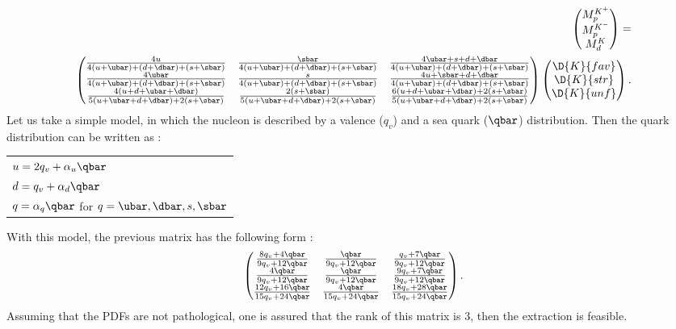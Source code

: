 \begin{equation} \label{eq:mult_sys}
  \begin{split}
  \begin{pmatrix}
    M^{K^+}_p \\
    M^{K^-}_p \\
    M^{K}_d
  \end{pmatrix}
  = \\
  \begin{pmatrix}
    \frac{4u}{4(u+\ubar)+(d+\dbar)+(s+\sbar)} & \frac{\sbar}{4(u+\ubar)+(d+\dbar)+(s+\sbar)} & \frac{4\ubar+s+d+\dbar}{4(u+\ubar)+(d+\dbar)+(s+\sbar)} \\
    \frac{4\ubar}{4(u+\ubar)+(d+\dbar)+(s+\sbar)} & \frac{s}{4(u+\ubar)+(d+\dbar)+(s+\sbar)} & \frac{4u+\sbar+d+\dbar}{4(u+\ubar)+(d+\dbar)+(s+\sbar)} \\
    \frac{4(u+d+\ubar+\dbar)}{5(u+\ubar+d+\dbar)+2(s+\sbar)} & \frac{2(s+\sbar)}{5(u+\ubar+d+\dbar)+2(s+\sbar)} & \frac{6(u+d+\ubar+\dbar)+2(s+\sbar)}{5(u+\ubar+d+\dbar)+2(s+\sbar)}
  \end{pmatrix}
  \begin{pmatrix}
    \D{K}{fav} \\
    \D{K}{str} \\
    \D{K}{unf}
  \end{pmatrix}.
  \end{split}
\end{equation}
%
Let us take a simple model, in which the nucleon is described by a valence ($q_v$) and a sea quark ($\qbar$) distribution. Then the quark distribution can be written as \cite{Jorg} :

\begin{center}
  \begin{tabular}{ l }
    $u = 2q_v + \alpha_u\qbar$ \\
    $d = q_v + \alpha_d\qbar$ \\
    $q = \alpha_q\qbar$ for $q=\ubar,\dbar,s,\sbar$ \\
  \end{tabular}
\end{center}

With this model, the previous matrix has the following form :
%
\begin{equation} \label{eq:mat_rank}
  \begin{pmatrix}
    \frac{8q_v+4\qbar}{9q_v+12\qbar} & \frac{\qbar}{9q_v+12\qbar} & \frac{q_v+7\qbar}{9q_v+12\qbar} \\
    \frac{4\qbar}{9q_v+12\qbar} & \frac{\qbar}{9q_v+12\qbar} & \frac{9q_v+7\qbar}{9q_v+12\qbar} \\
    \frac{12q_v+16\qbar}{15q_v+24\qbar} & \frac{4\qbar}{15q_v+24\qbar} & \frac{18q_v+28\qbar}{15q_v+24\qbar}
  \end{pmatrix}.
\end{equation}
%
Assuming that the PDFs are not pathological, one is assured that the rank of this matrix is 3, then the extraction is feasible.

